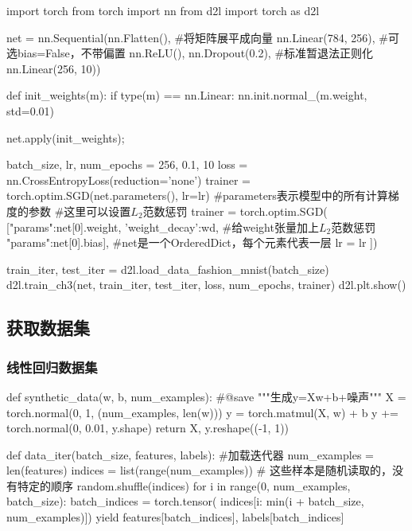       \begin{codeblock}[language=python, caption={Multilayer}]
        import torch
        from torch import nn
        from d2l import torch as d2l

        net = nn.Sequential(nn.Flatten(), #将矩阵展平成向量
                            nn.Linear(784, 256), #可选bias=False，不带偏置
                            nn.ReLU(),
                            nn.Dropout(0.2), #标准暂退法正则化
                            nn.Linear(256, 10))

        def init_weights(m):
            if type(m) == nn.Linear:
                nn.init.normal_(m.weight, std=0.01)

        net.apply(init_weights);

        batch_size, lr, num_epochs = 256, 0.1, 10
        loss = nn.CrossEntropyLoss(reduction='none')
        trainer = torch.optim.SGD(net.parameters(), lr=lr)
        #parameters表示模型中的所有计算梯度的参数
        #这里可以设置$L_2$范数惩罚
        trainer = torch.optim.SGD(
            [{"params":net[0].weight, 'weight_decay':wd}, #给weight张量加上$L_2$范数惩罚
             {"params":net[0].bias}], #net是一个OrderedDict，每个元素代表一层
            lr = lr
        ])

        train_iter, test_iter = d2l.load_data_fashion_mnist(batch_size)
        d2l.train_ch3(net, train_iter, test_iter, loss, num_epochs, trainer)
        d2l.plt.show()
      \end{codeblock}

  \subsection{获取数据集}
    \subsubsection{线性回归数据集}
      \begin{codeblock}[language=python, caption={Get linear data}]
        def synthetic_data(w, b, num_examples):  #@save
            """生成y=Xw+b+噪声"""
            X = torch.normal(0, 1, (num_examples, len(w)))
            y = torch.matmul(X, w) + b
            y += torch.normal(0, 0.01, y.shape)
            return X, y.reshape((-1, 1))

        def data_iter(batch_size, features, labels): #加载迭代器
            num_examples = len(features)
            indices = list(range(num_examples))
            # 这些样本是随机读取的，没有特定的顺序
            random.shuffle(indices)
            for i in range(0, num_examples, batch_size):
                batch_indices = torch.tensor(
                    indices[i: min(i + batch_size, num_examples)])
                yield features[batch_indices], labels[batch_indices]
      \end{codeblock}

